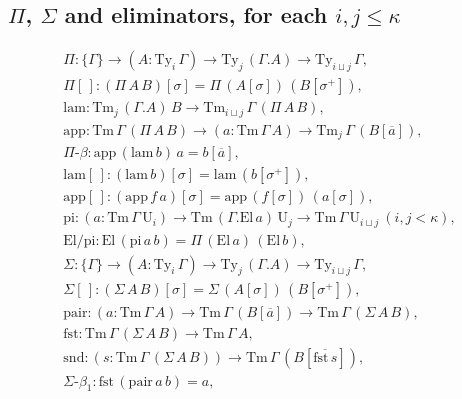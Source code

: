 \subsection{\texorpdfstring{$\Pi$}{Pi},
\texorpdfstring{$\Sigma$}{Sigma} and eliminators, for
each \texorpdfstring{$i,j\le\kappa$}{i,j<=k}}
\[\begin{array}{l}
    \Pi : \{\Gamma\}\to(A:\mathrm{Ty}_i\,\Gamma)
    \to\mathrm{Ty}_j\,(\Gamma.A)
    \to\mathrm{Ty}_{i\sqcup j}\,\Gamma,\\
    \Pi[\,] : (\Pi\,A\,B)[\sigma]=
    \Pi\,(A[\sigma])\,(B[\sigma^+]),\\
    \mathrm{lam} :
    \mathrm{Tm}_j\,(\Gamma.A)\,B\to
    \mathrm{Tm}_{i\sqcup j}\,\Gamma\,(\Pi\,A\,B),\\
    \mathrm{app} :
    \mathrm{Tm}\,\Gamma\,(\Pi\,A\,B)
    \to(a:\mathrm{Tm}\,\Gamma\,A)
    \to\mathrm{Tm}_j\,\Gamma\,(B[\overline a]),\\
    \Pi\text{-}\beta : \mathrm{app}\,(\mathrm{lam}\,b)\,
        a = b[\overline a],\\
    \mathrm{lam}[\,] :
        (\mathrm{lam}\,b)[\sigma]=
        \mathrm{lam}\,(b[\sigma^+]),\\
    \mathrm{app}[\,] :
        (\mathrm{app}\,f\,a)[\sigma]=
        \mathrm{app}\,(f[\sigma])\,(a[\sigma]),\\
    \mathrm{pi} : (a:\mathrm{Tm}\,\Gamma\,\mathrm U_i)
    \to\mathrm{Tm}\,(\Gamma.\mathrm{El}\,a)\,
    \mathrm U_j\to\mathrm{Tm}\,\Gamma\,
    \mathrm U_{i\sqcup j}\ (i,j<\kappa),\\
    \mathrm{El/pi} : \mathrm{El}\,(\mathrm{pi}\,a\,b)=
    \Pi\,(\mathrm{El}\,a)\,(\mathrm{El}\,b),\\
    \Sigma : \{\Gamma\}\to(A:\mathrm{Ty}_i\,\Gamma)
    \to\mathrm{Ty}_j\,(\Gamma.A)
    \to\mathrm{Ty}_{i\sqcup j}\,\Gamma,\\
    \Sigma[\,] : (\Sigma\,A\,B)[\sigma]=
    \Sigma\,(A[\sigma])\,(B[\sigma^+]),\\
    \mathrm{pair} : (a:\mathrm{Tm}\,\Gamma\,A)\to
        \mathrm{Tm}\,\Gamma\,(B[\overline a])\to
        \mathrm{Tm}\,\Gamma\,(\Sigma\,A\,B),\\
    \mathrm{fst} : \mathrm{Tm}\,\Gamma\,(\Sigma\,A\,B)
        \to\mathrm{Tm}\,\Gamma\,A,\\
    \mathrm{snd} : (s:\mathrm{Tm}\,\Gamma\,
        (\Sigma\,A\,B))\to\mathrm{Tm}\,\Gamma\,
        (B[\overline{\mathrm{fst}\,s}]),\\
    \Sigma\text{-}\beta_1 :
        \mathrm{fst}\,(\mathrm{pair}\,a\,b)=a,\\

\end{array}\]
